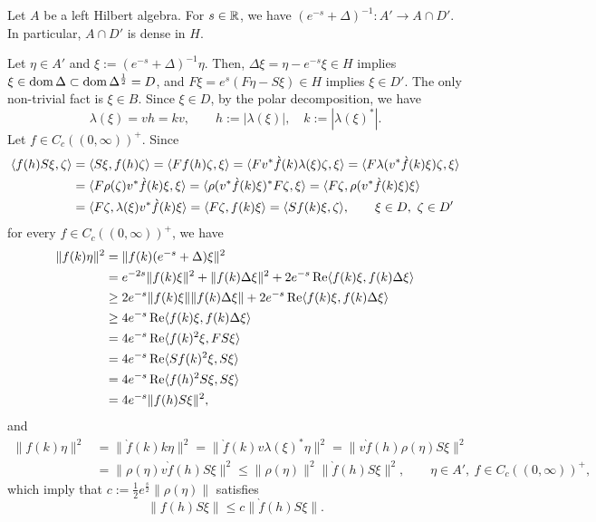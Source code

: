 \documentclass{../../small}
\begin{document}
\begin{lem}
Let $A$ be a left Hilbert algebra.
For $s\in\mathbb{R}$, we have $(e^{-s}+\Delta)^{-1}:A'\to A\cap D'$.
In particular, $A\cap D'$ is dense in $H$.
\end{lem}
\begin{pf}
Let $\eta\in A'$ and $\xi:=(e^{-s}+\Delta)^{-1}\eta$.
Then, $\Delta\xi=\eta-e^{-s}\xi\in H$ implies $\xi\in\operatorname{dom}\Delta\subset\operatorname{dom}\Delta^{\frac12}=D$, and $F\xi=e^s(F\eta-S\xi)\in H$ implies $\xi\in D'$.
The only non-trivial fact is $\xi\in B$.
Since $\xi\in D$, by the polar decomposition, we have
\[\lambda(\xi)=vh=kv,\qquad h:=|\lambda(\xi)|,\quad k:=|\lambda(\xi)^*|.\]
Let $f\in C_c((0,\infty))^+$.
Since
\begin{align*}
\langle f(h)S\xi,\zeta\rangle
&=\langle S\xi,f(h)\zeta\rangle
=\langle Ff(h)\zeta,\xi\rangle
=\langle Fv^*\grave f(k)\lambda(\xi)\zeta,\xi\rangle
=\langle F\lambda(v^*\grave f(k)\xi)\zeta,\xi\rangle\\
&=\langle F\rho(\zeta)v^*\grave f(k)\xi,\xi\rangle
=\langle\rho(v^*\grave f(k)\xi)^*F\zeta,\xi\rangle
=\langle F\zeta,\rho(v^*\grave f(k)\xi)\xi\rangle\\
&=\langle F\zeta,\lambda(\xi)v^*\grave f(k)\xi\rangle
=\langle F\zeta,f(k)\xi\rangle
=\langle Sf(k)\xi,\zeta\rangle,\qquad\xi\in D,\ \zeta\in D'
\end{align*}
for every $f\in C_c((0,\infty))^+$, we have
\begin{align*}
\|f(k)\eta\|^2
&=\|f(k)(e^{-s}+\Delta)\xi\|^2\\
&=e^{-2s}\|f(k)\xi\|^2+\|f(k)\Delta\xi\|^2+2e^{-s}\operatorname{Re}\langle f(k)\xi,f(k)\Delta\xi\rangle\\
&\ge2e^{-s}\|f(k)\xi\|\|f(k)\Delta\xi\|+2e^{-s}\operatorname{Re}\langle f(k)\xi,f(k)\Delta\xi\rangle\\
&\ge4e^{-s}\operatorname{Re}\langle f(k)\xi,f(k)\Delta\xi\rangle\\
&=4e^{-s}\operatorname{Re}\langle f(k)^2\xi,FS\xi\rangle\\
&=4e^{-s}\operatorname{Re}\langle Sf(k)^2\xi,S\xi\rangle\\
&=4e^{-s}\operatorname{Re}\langle f(h)^2S\xi,S\xi\rangle\\
&=4e^{-s}\|f(h)S\xi\|^2,
\end{align*}
and
\begin{align*}
\|f(k)\eta\|^2
&=\|\grave f(k)k\eta\|^2
=\|\grave f(k)v\lambda(\xi)^*\eta\|^2
=\|v\grave f(h)\rho(\eta)S\xi\|^2\\
&=\|\rho(\eta)v\grave f(h)S\xi\|^2
\le\|\rho(\eta)\|^2\|\grave f(h)S\xi\|^2,\qquad\eta\in A',\ f\in C_c((0,\infty))^+,
\end{align*}
which imply that $c:=\frac12e^{\frac s2}\|\rho(\eta)\|$ satisfies
\[\|f(h)S\xi\|\le c\|\grave f(h)S\xi\|.\]


\end{pf}
\end{document}
